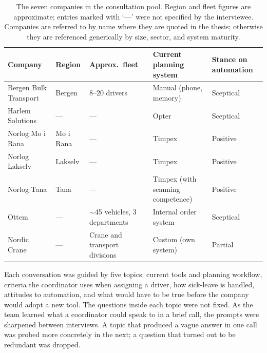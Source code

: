\begin{table}[h]
\centering
\caption{The seven companies in the consultation pool. Region and fleet figures are approximate; entries marked with `---' were not specified by the interviewee. Companies are referred to by name where they are quoted in the thesis; otherwise they are referenced generically by size, sector, and system maturity.}
\label{tab:companies}
\small
\begin{tabular}{p{}p{}p{}p{}p{}}
\toprule
\textbf{Company} & \textbf{Region} & \textbf{Approx.\ fleet} & \textbf{Current planning system} & \textbf{Stance on automation} \\
\midrule
Bergen Bulk Transport & Bergen     & 8--20 drivers           & Manual (phone, memory)               & Sceptical \\
Harlem Solutions      & ---        & ---                     & Opter                                 & Sceptical \\
Norlog Mo i Rana      & Mo i Rana  & ---                     & Timpex                                & Positive \\
Norlog Lakselv        & Lakselv    & ---                     & Timpex                                & Positive \\
Norlog Tana           & Tana       & ---                     & Timpex (with scanning competence)     & Positive \\
Ottem                 & ---        & $\sim$45 vehicles, 3 departments & Internal order system        & Sceptical \\
Nordic Crane          & ---        & Crane and transport divisions    & Custom (own system)          & Partial \\
\bottomrule
\end{tabular}
\end{table}

Each conversation was guided by five topics: current tools and planning workflow, criteria the coordinator uses when assigning a driver, how sick-leave is handled, attitudes to automation, and what would have to be true before the company would adopt a new tool. The questions inside each topic were not fixed. As the team learned what a coordinator could speak to in a brief call, the prompts were sharpened between interviews. A topic that produced a vague answer in one call was probed more concretely in the next; a question that turned out to be redundant was dropped.


